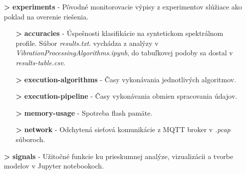 \begin{itemize}[noitemsep]
\begin{itemize}
	\item[\textbf{>}] \textbf{experiments} - Pôvodné monitorovacie výpisy z experimentov slúžiace ako poklad na overenie riešenia.
		\begin{itemize}
			\item[\textbf{>}] \textbf{accuracies} - Úspešnosti klasifikácie na syntetickom spektrálnom profile. Súbor \emph{results.txt}.
			vychádza z analýzy v \emph{VibrationProcessingAlgorithms.ipynb}, do tabuľkovej podoby sa dostal v \emph{results-table.csv}.
			\item[\textbf{>}] \textbf{execution-algorithms} - Časy vykonávania jednotlivých algoritmov.
			\item[\textbf{>}] \textbf{execution-pipeline} - Časy vykonávania obmien spracovania údajov.
			\item[\textbf{>}] \textbf{memory-usage} - Spotreba flash pamäte.
			\item[\textbf{>}] \textbf{network} - Odchytená sieťová komunikácie z MQTT broker v \emph{.pcap} súboroch.
		\end{itemize}
	\item[\textbf{>}] \textbf{signals} - Užitočné funkcie ku prieskumnej analýze, vizualizácii a tvorbe modelov v Jupyter notebookoch.	
	\end{itemize}
\end{itemize}
